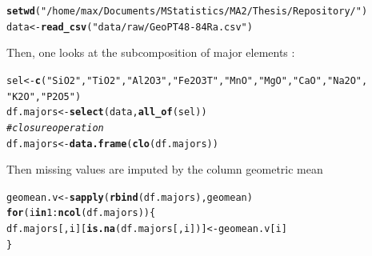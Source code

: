 \documentclass[a4paper,oneside,12pt,titlepage]{article}\usepackage[]{graphicx}\usepackage[]{color}
\makeatletter
\newcommand{\hlnum}[1]{\textcolor[rgb]{0.686,0.059,0.569}{#1}}%
\newcommand{\hlstr}[1]{\textcolor[rgb]{0.192,0.494,0.8}{#1}}%
\newcommand{\hlcom}[1]{\textcolor[rgb]{0.678,0.584,0.686}{\textit{#1}}}%
\newcommand{\hlopt}[1]{\textcolor[rgb]{0,0,0}{#1}}%
\newcommand{\hlstd}[1]{\textcolor[rgb]{0.345,0.345,0.345}{#1}}%
\newcommand{\hlkwa}[1]{\textcolor[rgb]{0.161,0.373,0.58}{\textbf{#1}}}%
\newcommand{\hlkwb}[1]{\textcolor[rgb]{0.69,0.353,0.396}{#1}}%
\newcommand{\hlkwd}[1]{\textcolor[rgb]{0.737,0.353,0.396}{\textbf{#1}}}%
\newenvironment{kframe}{%
 \def\at@end@of@kframe{}%
 \ifinner\ifhmode%
  \def\at@end@of@kframe{\end{minipage}}%
  \begin{minipage}{\columnwidth}%
 \fi\fi%
 \def\FrameCommand##1{\hskip\@totalleftmargin \hskip-\fboxsep
 \colorbox{shadecolor}{##1}\hskip-\fboxsep
     \hskip-\linewidth \hskip-\@totalleftmargin \hskip\columnwidth}%
 \MakeFramed {\advance\hsize-\width
   \@totalleftmargin\z@ \linewidth\hsize
   \@setminipage}}%
 {\par\unskip\endMakeFramed%
 \at@end@of@kframe}
\newenvironment{knitrout}{}{} %
\makeatother
\begin{document}
\begin{knitrout}
\color{fgcolor}\begin{kframe}
\begin{alltt}
\hlkwd{setwd}\hlstd{(}\hlstr{"/home/max/Documents/MStatistics/MA2/Thesis/Repository/"}\hlstd{)}
\hlstd{data} \hlkwb{<-} \hlkwd{read_csv}\hlstd{(}\hlstr{"data/raw/GeoPT48 -84Ra.csv"}\hlstd{)}
\end{alltt}


{\ttfamily\noindent\itshape\color{messagecolor}{\#\# \\\#\# -- Column specification --------------------------------------------------------\\\#\# cols(\\\#\# \ \ .default = col\_double(),\\\#\# \ \ Laboratory = col\_character(),\\\#\# \ \ Au = col\_logical(),\\\#\# \ \ N = col\_logical(),\\\#\# \ \ Os = col\_logical()\\\#\# )\\\#\# i Use `spec()` for the full column specifications.}}\end{kframe}
\end{knitrout}
Then, one looks at the subcomposition of major elements :
\begin{knitrout}
\color{fgcolor}\begin{kframe}
\begin{alltt}
\hlstd{sel} \hlkwb{<-}\hlkwd{c}\hlstd{(}\hlstr{"SiO2"}\hlstd{,}\hlstr{"TiO2"}\hlstd{,}\hlstr{"Al2O3"}\hlstd{,}\hlstr{"Fe2O3T"}\hlstd{,}\hlstr{"MnO"}\hlstd{,}\hlstr{"MgO"}\hlstd{,}\hlstr{"CaO"}\hlstd{,}\hlstr{"Na2O"}\hlstd{,}
        \hlstr{"K2O"}\hlstd{,}\hlstr{"P2O5"}\hlstd{)}
\hlstd{df.majors} \hlkwb{<-} \hlkwd{select}\hlstd{(data,}\hlkwd{all_of}\hlstd{(sel))}
\hlcom{# closure operation}
\hlstd{df.majors} \hlkwb{<-} \hlkwd{data.frame}\hlstd{(}\hlkwd{clo}\hlstd{(df.majors))}
\end{alltt}
\end{kframe}
\end{knitrout}
Then  missing values are imputed by the column geometric mean
\begin{knitrout}
\color{fgcolor}\begin{kframe}
\begin{alltt}
\hlstd{geomean.v} \hlkwb{<-} \hlkwd{sapply}\hlstd{(}\hlkwd{rbind}\hlstd{(df.majors),geomean)}
\hlkwa{for} \hlstd{(i} \hlkwa{in} \hlnum{1}\hlopt{:}\hlkwd{ncol}\hlstd{(df.majors))\{}
  \hlstd{df.majors[,i][}\hlkwd{is.na}\hlstd{(df.majors[,i])]} \hlkwb{<-} \hlstd{geomean.v[i]}
\hlstd{\}}
\end{alltt}
\end{kframe}
\end{knitrout}
\end{document}
